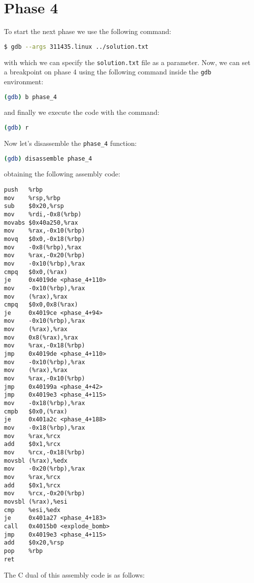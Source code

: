 \documentclass[a4paper,12pt]{report}  %
\newcommand{\lstinlinebg}[1]{\colorbox{backcolour}{\lstinline|#1|}}
\begin{document}
\section{Phase 4}
To start the next phase we use the following command:
\begin{lstlisting}[language=bash,numbers=none]
$ gdb --args 311435.linux ../solution.txt
\end{lstlisting}
with which we can specify the \lstinlinebg{solution.txt} file as a parameter.
Now, we can set a breakpoint on phase 4 using the following command inside the \lstinlinebg{gdb} environment:
\begin{lstlisting}[language=bash, numbers=none]
(gdb) b phase_4
\end{lstlisting}
and finally we execute the code with the command:
\begin{lstlisting}[language=bash, numbers=none]
(gdb) r
\end{lstlisting}
Now let's disassemble the \lstinlinebg{phase_4} function:
\begin{lstlisting}[language=bash, numbers=none]
(gdb) disassemble phase_4
\end{lstlisting}
obtaining the following assembly code:
\begin{lstlisting}[language=x86_64]
push   %rbp
mov    %rsp,%rbp
sub    $0x20,%rsp
mov    %rdi,-0x8(%rbp)
movabs $0x40a250,%rax
mov    %rax,-0x10(%rbp)
movq   $0x0,-0x18(%rbp)
mov    -0x8(%rbp),%rax
mov    %rax,-0x20(%rbp)
mov    -0x10(%rbp),%rax
cmpq   $0x0,(%rax)
je     0x4019de <phase_4+110>
mov    -0x10(%rbp),%rax
mov    (%rax),%rax
cmpq   $0x0,0x8(%rax)
je     0x4019ce <phase_4+94>
mov    -0x10(%rbp),%rax
mov    (%rax),%rax
mov    0x8(%rax),%rax
mov    %rax,-0x18(%rbp)
jmp    0x4019de <phase_4+110>
mov    -0x10(%rbp),%rax
mov    (%rax),%rax
mov    %rax,-0x10(%rbp)
jmp    0x40199a <phase_4+42>
jmp    0x4019e3 <phase_4+115>
mov    -0x18(%rbp),%rax
cmpb   $0x0,(%rax)
je     0x401a2c <phase_4+188>
mov    -0x18(%rbp),%rax
mov    %rax,%rcx
add    $0x1,%rcx
mov    %rcx,-0x18(%rbp)
movsbl (%rax),%edx
mov    -0x20(%rbp),%rax
mov    %rax,%rcx
add    $0x1,%rcx
mov    %rcx,-0x20(%rbp)
movsbl (%rax),%esi
cmp    %esi,%edx
je     0x401a27 <phase_4+183>
call   0x4015b0 <explode_bomb>
jmp    0x4019e3 <phase_4+115>
add    $0x20,%rsp
pop    %rbp
ret
\end{lstlisting}
The C dual of this assembly code is as follows:
\end{document}
